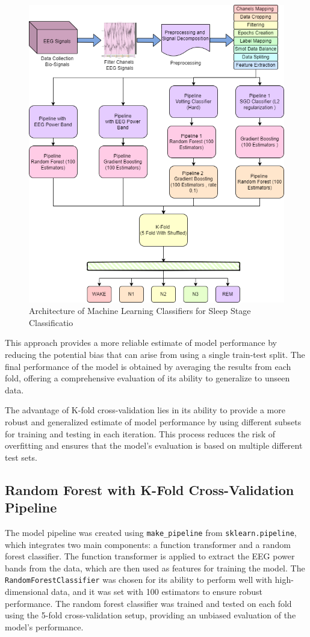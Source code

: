 \begin{figure}[H]
	\centering
	\includegraphics[width=0.6\linewidth]{"img/paper_1/k-FOLD.PNG"}
	\caption{Architecture of Machine Learning Classifiers for Sleep Stage
		Classificatio}
	\label{fig:architechture1}
\end{figure}







This approach provides a more reliable estimate of model performance by reducing the potential bias that can arise from using a single train-test split. The final performance of the model is obtained by averaging the results from each fold, offering a comprehensive evaluation of its ability to generalize to unseen data.

The advantage of K-fold cross-validation lies in its ability to provide a more robust and generalized estimate of model performance by using different subsets for training and testing in each iteration. This process reduces the risk of overfitting and ensures that the model's evaluation is based on multiple different test sets.

\subsection{Random Forest with K-Fold Cross-Validation Pipeline}

The model pipeline was created using \texttt{make\_pipeline} from \texttt{sklearn.pipeline}, which integrates two main components: a function transformer and a random forest classifier. The function transformer is applied to extract the EEG power bands from the data, which are then used as features for training the model. The \texttt{RandomForestClassifier} was chosen for its ability to perform well with high-dimensional data, and it was set with 100 estimators to ensure robust performance. The random forest classifier was trained and tested on each fold using the 5-fold cross-validation setup, providing an unbiased evaluation of the model’s performance.



